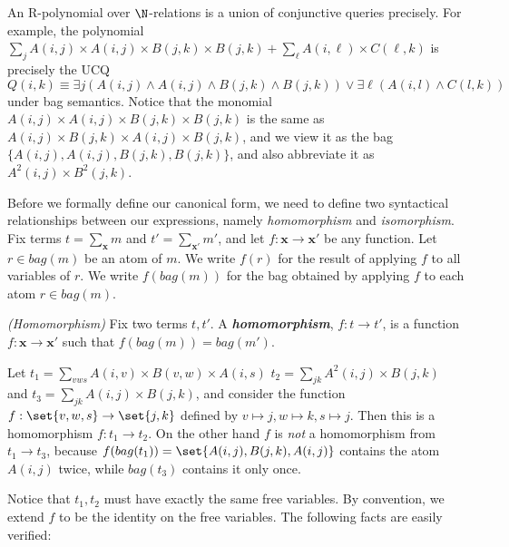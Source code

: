 \begin{ex}{} An R-polynomial over $\N$-relations is a union of conjunctive queries precisely.  For example, the polynomial $\sum_{j} A(i,j) \times A(i,j) \times B(j,k) \times B(j,k) + \sum_{\ell} A(i,\ell) \times C(\ell,k)$ is precisely the UCQ $Q(i,k) \equiv \exists j (A(i, j) \wedge A(i, j) \wedge B(j, k) \wedge B(j, k)) \vee \exists \ell (A(i, l) \wedge C(l, k))$ under bag semantics.  Notice that
  the monomial $A(i,j) \times A(i,j) \times B(j,k) \times B(j,k)$ is the same as $A(i,j) \times B(j,k) \times A(i,j) \times B(j,k)$, and we view it as the bag $\{A(i,j), A(i,j), B(j,k), B(j,k)\}$, and also abbreviate it as $A^2(i,j) \times B^2(j,k)$.
\end{ex}
Before we formally define our canonical form, we need to define two syntactical relationships between our expressions, namely {\em homomorphism} and {\em isomorphism}. Fix terms $t = \sum_{\pmb{x}} m$ and $t' = \sum_{\pmb{x'}} m'$, and let $f: \pmb{x} \rightarrow \pmb{x}'$ be any function. Let $r \in bag(m)$ be an atom of $m$. We write $f(r)$ for the result of applying $f$ to all variables of $r$. We write $f(bag(m))$ for the bag obtained by applying $f$ to each atom $r \in bag(m)$. 
\begin{defn}{\em (Homomorphism)}
  Fix two terms $t, t'$.  A \emph{\textbf{homomorphism}}, $f : t \rightarrow t'$, is a function $f: \pmb{x} \rightarrow \pmb{x}'$ such that $f(bag(m))=bag(m')$.
\end{defn}{}
\begin{ex}
  Let $t_1 = \sum_{vws} A(i,v) \times B(v,w) \times A(i,s)$ $t_2= \sum_{jk} A^2(i,j) \times B(j,k)$ and $t_3 = \sum_{jk} A(i,j) \times B(j,k)$, and consider the function $f: \set{v,w,s} \rightarrow \set{j,k}$ defined by $v \mapsto j, w \mapsto k, s \mapsto j$.  Then this is a homomorphism $f : t_1 \rightarrow t_2$.  On the other hand $f$ is {\em not} a homomorphism from $t_1 \rightarrow t_3$, because $f(bag(t_1)) = \set{A(i,j), B(j,k), A(i,j)}$ contains the atom $A(i,j)$ twice, while $bag(t_3)$ contains it only once.
\end{ex}
Notice that $t_1, t_2$ must have exactly the same free variables.  By convention, we extend $f$ to be the identity on the free variables.  The following facts are easily verified:
